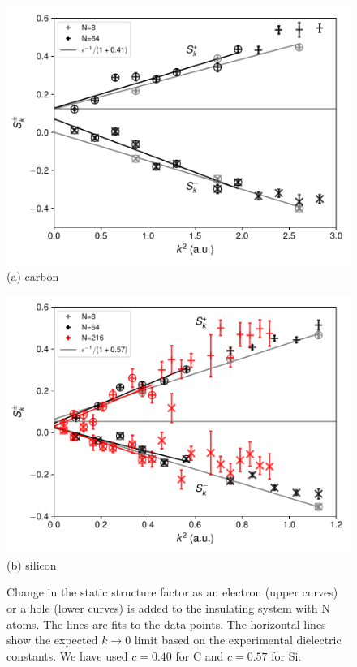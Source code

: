 \begin{figure}
\begin{minipage}[b]{\columnwidth}
\includegraphics[width=\columnwidth]{si30c_skpm-ceps-c-k2-fit}
(a) carbon
\end{minipage}
\begin{minipage}[b]{\columnwidth}
\includegraphics[width=\columnwidth]{si30c_skpm-ceps-si-k2-fit}
(b) silicon
\end{minipage}
\caption{Change in the static structure factor as an electron (upper curves) or a hole (lower curves) is added to the insulating system with N atoms. %
The lines are fits to the data points.
The horizontal lines show the expected $k\rightarrow0$ limit based on the experimental dielectric constants. We have used $c=0.40$ for C and $c=0.57$ for Si.
\label{fig:c-si-skpm}}
\end{figure}

